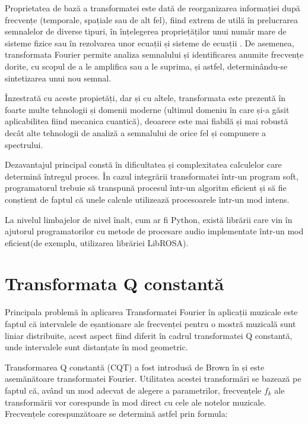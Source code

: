 \documentclass[a4paper,12pt]{report}
\begin{document}
Proprietatea de bază a transformatei este dată de reorganizarea informației 
după frecvențe (temporale, spațiale sau de alt fel), 
fiind extrem de utilă în prelucrarea semnalelor de diverse tipuri, 
în înțelegerea propriețăților unui număr mare de sisteme fizice sau 
în rezolvarea unor ecuații și sisteme de ecuații \cite{Fourier-Transform}.
De asemenea, transformata Fourier permite analiza semnalului și identificarea anumite
frecvențe dorite, cu scopul de a le amplifica sau a le suprima, și astfel, determinându-se sintetizarea unui
nou semnal. 

Înzestrată cu aceste propietăți, dar și cu altele, transformata este 
prezentă în foarte multe tehnologii și domenii moderne (ultimul domeniu în care și-a găsit aplicabilitea 
fiind mecanica cuantică), deoarece este mai fiabilă și mai robustă decât alte tehnologii de analiză
a semnalului de orice fel și compunere a spectrului.

Dezavantajul principal constă în dificultatea și complexitatea 
calculelor care determină întregul proces. În cazul integrării transformatei
într-un program soft, programatorul trebuie să transpună procesul 
într-un algoritm eficient și să fie conștient de faptul că unele calcule
utilizează procesoarele într-un mod intens.

La nivelul limbajelor de nivel înalt, cum ar fi Python, există librării care vin în
ajutorul programatorilor cu metode de procesare audio implementate într-un mod eficient(de exemplu, utilizarea
librăriei LibROSA).

\newpage
\section{Transformata Q constantă}
Principala problemă în aplicarea Transformatei Fourier în aplicații muzicale este faptul că intervalele
de eșantionare ale frecvenței pentru o mostră muzicală sunt liniar distribuite, acest aspect fiind diferit
în cadrul transformatei Q constantă, unde intervalele sunt distanțate în mod geometric.

Transformarea Q constantă (CQT) a fost introdusă de Brown în \cite{Constant-Q-Spectral} și este 
asemănătoare transformatei Fourier.
Utilitatea acestei 
transformări se bazează pe faptul că, având un mod adecvat de alegere a parametrilor, 
frecvențele $f_k$ ale transformării vor corespunde
în mod direct cu cele ale notelor muzicale. Frecvențele corespunzătoare se determină
astfel prin formula:
\end{document}
